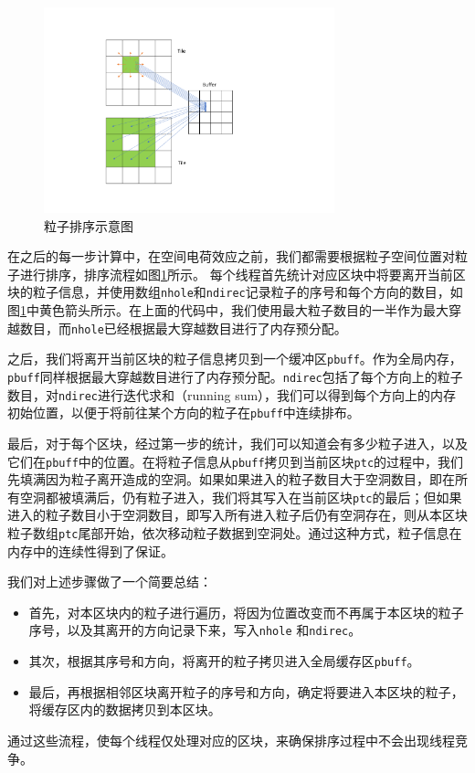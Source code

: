 \begin{figure}[!htb]
    \centering
    \includegraphics[width=0.75\textwidth]{Img/3PIC_reorder.pdf}
    \caption{粒子排序示意图}
    \label{fig:PIC_reorder}
\end{figure}
在之后的每一步计算中，在空间电荷效应之前，我们都需要根据粒子空间位置对粒子进行排序，排序流程如图\ref{fig:PIC_reorder}所示。
每个线程首先统计对应区块中将要离开当前区块的粒子信息，并使用数组\verb"nhole"和\verb"ndirec"记录粒子的序号和每个方向的数目，如图\ref{fig:PIC_reorder}中黄色箭头所示。在上面的代码中，我们使用最大粒子数目的一半作为最大穿越数目，而\verb"nhole"已经根据最大穿越数目进行了内存预分配。

之后，我们将离开当前区块的粒子信息拷贝到一个缓冲区\verb"pbuff"。作为全局内存，\verb"pbuff"同样根据最大穿越数目进行了内存预分配。\verb"ndirec"包括了每个方向上的粒子数目，对\verb"ndirec"进行迭代求和（running sum），我们可以得到每个方向上的内存初始位置，以便于将前往某个方向的粒子在\verb"pbuff"中连续排布。

最后，对于每个区块，经过第一步的统计，我们可以知道会有多少粒子进入，以及它们在\verb"pbuff"中的位置。在将粒子信息从\verb"pbuff"拷贝到当前区块\verb"ptc"的过程中，我们先填满因为粒子离开造成的空洞。如果如果进入的粒子数目大于空洞数目，即在所有空洞都被填满后，仍有粒子进入，我们将其写入在当前区块\verb"ptc"的最后；但如果进入的粒子数目小于空洞数目，即写入所有进入粒子后仍有空洞存在，则从本区块粒子数组\verb"ptc"尾部开始，依次移动粒子数据到空洞处。通过这种方式，粒子信息在内存中的连续性得到了保证。

我们对上述步骤做了一个简要总结：
\begin{itemize}
  \item 首先，对本区块内的粒子进行遍历，将因为位置改变而不再属于本区块的粒子序号，以及其离开的方向记录下来，写入\verb"nhole" 和\verb"ndirec"。
  \item 其次，根据其序号和方向，将离开的粒子拷贝进入全局缓存区\verb"pbuff"。
  \item 最后，再根据相邻区块离开粒子的序号和方向，确定将要进入本区块的粒子，将缓存区内的数据拷贝到本区块。
\end{itemize}
通过这些流程，使每个线程仅处理对应的区块，来确保排序过程中不会出现线程竞争。

